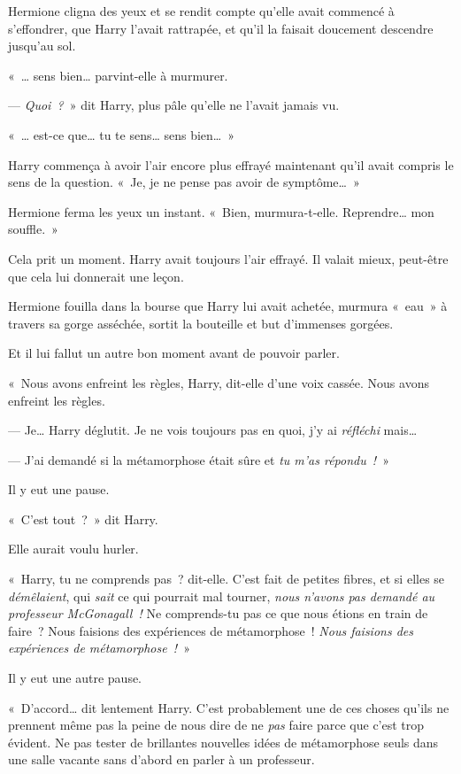 Hermione cligna des yeux et se rendit compte qu'elle avait commencé à s'effondrer, que Harry l'avait rattrapée, et qu'il la faisait doucement descendre jusqu'au sol.

«~… sens bien… parvint-elle à murmurer.

--- \emph{Quoi~?}~» dit Harry, plus pâle qu'elle ne l'avait jamais vu.

«~… est-ce que… tu te sens… sens bien…~»

Harry commença à avoir l'air encore plus effrayé maintenant qu'il avait compris le sens de la question. «~Je, je ne pense pas avoir de symptôme…~»

Hermione ferma les yeux un instant. «~Bien, murmura-t-elle. Reprendre… mon souffle.~»

Cela prit un moment. Harry avait toujours l'air effrayé. Il valait mieux, peut-être que cela lui donnerait une leçon.

Hermione fouilla dans la bourse que Harry lui avait achetée, murmura «~eau~» à travers sa gorge asséchée, sortit la bouteille et but d'immenses gorgées.

Et il lui fallut un autre bon moment avant de pouvoir parler.

«~Nous avons enfreint les règles, Harry, dit-elle d'une voix cassée. Nous avons enfreint les règles.

--- Je… Harry déglutit. Je ne vois toujours pas en quoi, j'y ai \emph{réfléchi} mais…

--- J'ai demandé si la métamorphose était sûre et \emph{tu m'as répondu~!}~»

Il y eut une pause.

«~C'est tout~?~» dit Harry.

Elle aurait voulu hurler.

«~Harry, tu ne comprends pas~? dit-elle. C'est fait de petites fibres, et si elles se \emph{démêlaient}, qui \emph{sait} ce qui pourrait mal tourner, \emph{nous n'avons pas demandé au professeur McGonagall~!} Ne comprends-tu pas ce que nous étions en train de faire~? Nous faisions des expériences de métamorphose~! \emph{Nous faisions des expériences de métamorphose~!}~»

Il y eut une autre pause.

«~D'accord… dit lentement Harry. C'est probablement une de ces choses qu'ils ne prennent même pas la peine de nous dire de ne \emph{pas} faire parce que c'est trop évident. Ne pas tester de brillantes nouvelles idées de métamorphose seuls dans une salle vacante sans d'abord en parler à un professeur.


